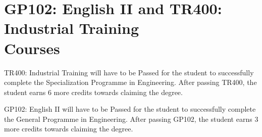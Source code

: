\documentclass[12pt]{article}
\begin{document}



\section[GP102: English II and TR400: Industrial Training Courses]{\texorpdfstring{GP102: English II and TR400: Industrial Training \\Courses}{GP102: English II and TR400: Industrial Training Courses}}

TR400: Industrial Training will have to be Passed for the student to successfully complete the Specialization Programme in Engineering. After passing TR400, the student earns 6 more credits towards claiming the degree.

\noindent GP102: English II will have to be Passed for the student to successfully complete the General Programme in Engineering. After passing GP102, the student earns 3 more credits towards claiming the degree.
\end{document}
